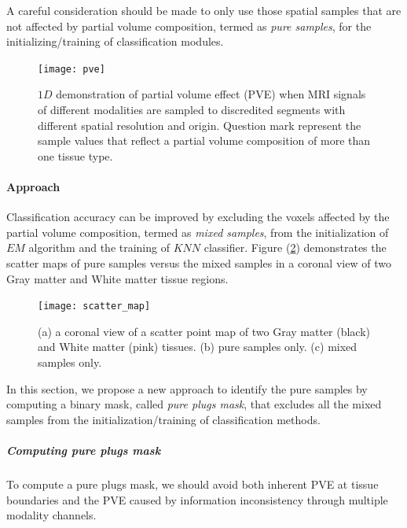 A careful consideration should be made to only use those spatial samples that are not affected by partial volume composition, termed as \textit{pure samples}, for the initializing/training of classification modules.

\begin{figure}
\centering
\texttt{[image: pve]}\
\centering
\caption{$1D$ demonstration of partial volume effect (PVE) when MRI signals of different modalities are sampled to discredited segments with different spatial resolution and origin. Question mark represent the sample values that reflect a partial volume composition of more than one tissue type.}
\label{fig:pve}
\end{figure}

\paragraph{Approach} %

Classification accuracy can be improved by excluding the voxels affected by the partial volume composition, termed as \textit{mixed samples}, from the initialization of $EM$ algorithm and the training of $KNN$ classifier.
Figure (\ref{fig:scatter_map}) demonstrates the scatter maps of pure samples versus the mixed samples in a coronal view of two Gray matter and White matter tissue regions.

\begin{figure}
\centering
\texttt{[image: scatter\_map]}\
\centering
\caption{(a) a coronal view of a scatter point map of two Gray matter (black) and White matter (pink) tissues. (b) pure samples only. (c) mixed samples only.}
\label{fig:scatter_map}
\end{figure}

In this section, we propose a new approach to identify the pure samples by computing a binary mask, called \textit{pure plugs mask}, that excludes all the mixed samples from the initialization/training of classification methods.

\subparagraph{Computing pure plugs mask}

To compute a pure plugs mask, we should avoid both inherent PVE at tissue boundaries and the PVE caused by information inconsistency through multiple modality channels.

